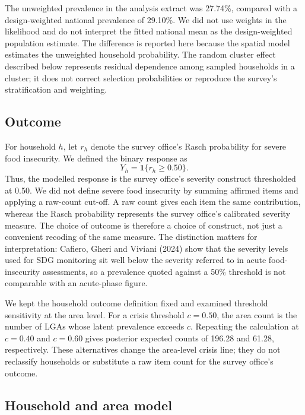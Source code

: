 The unweighted prevalence in the analysis extract was 27.74\%, compared with a design-weighted national prevalence of 29.10\%. We did not use weights in the likelihood and do not interpret the fitted national mean as the design-weighted population estimate. The difference is reported here because the spatial model estimates the unweighted household probability. The random cluster effect described below represents residual dependence among sampled households in a cluster; it does not correct selection probabilities or reproduce the survey's stratification and weighting.

\subsection{Outcome}

For household \(h\), let \(r_h\) denote the survey office's Rasch probability for severe food insecurity. We defined the binary response as
\[
  Y_h = \mathbf{1}\{r_h \geq 0.50\}.
\]
Thus, the modelled response is the survey office's severity construct thresholded at 0.50. We did not define severe food insecurity by summing affirmed items and applying a raw-count cut-off. A raw count gives each item the same contribution, whereas the Rasch probability represents the survey office's calibrated severity measure. The choice of outcome is therefore a choice of construct, not just a convenient recoding of the same measure. The distinction matters for interpretation: Cafiero, Gheri and Viviani (2024) show that the severity levels used for SDG monitoring sit well below the severity referred to in acute food-insecurity assessments, so a prevalence quoted against a 50\% threshold is not comparable with an acute-phase figure.

We kept the household outcome definition fixed and examined threshold sensitivity at the area level. For a crisis threshold \(c=0.50\), the area count is the number of LGAs whose latent prevalence exceeds \(c\). Repeating the calculation at \(c=0.40\) and \(c=0.60\) gives posterior expected counts of 196.28 and 61.28, respectively. These alternatives change the area-level crisis line; they do not reclassify households or substitute a raw item count for the survey office's outcome.

\subsection{Household and area model}

